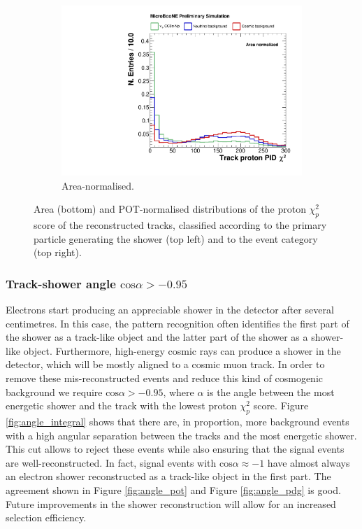 \begin{figure}[htbp]
\begin{subfigure}{0.49\textwidth}
    \includegraphics[width=\linewidth]{figures/h_track_pidchipr_norm.pdf}
    \caption{Area-normalised.} \label{fig:proton_norm}
  \end{subfigure}
  \caption{Area (bottom) and POT-normalised distributions of the proton $\chi_{p}^2$ score of the reconstructed tracks, classified according to the primary particle generating the shower (top left) and to the event category (top right).}\label{fig:proton_bkg}
\end{figure}

\subsubsection*{Track-shower angle $\mathrm{cos}\alpha > -0.95$}
Electrons start producing an appreciable shower in the detector after several centimetres. In this case, the pattern recognition often identifies the first part of the shower as a track-like object and the latter part of the shower as a shower-like object. 
Furthermore, high-energy cosmic rays can produce a shower in the detector, which will be mostly aligned to a cosmic muon track. In order to remove these mis-reconstructed events and reduce this kind of cosmogenic background we require $\mathrm{cos}\alpha > -0.95$, where $\alpha$ is the angle between the most energetic shower and the track with the lowest proton $\chi_{p}^2$ score.
Figure \ref{fig:angle_integral} shows that there are, in proportion, more background events with a high angular separation between the tracks and the most energetic shower. This cut allows to reject these events while also ensuring that the signal events are well-reconstructed. In fact, signal events with $\mathrm{cos}\alpha \approx -1$ have almost always an electron shower reconstructed as a track-like object in the first part. The agreement shown in Figure \ref{fig:angle_pot} and Figure \ref{fig:angle_pdg} is good. Future improvements in the shower reconstruction will allow for an increased selection efficiency.

